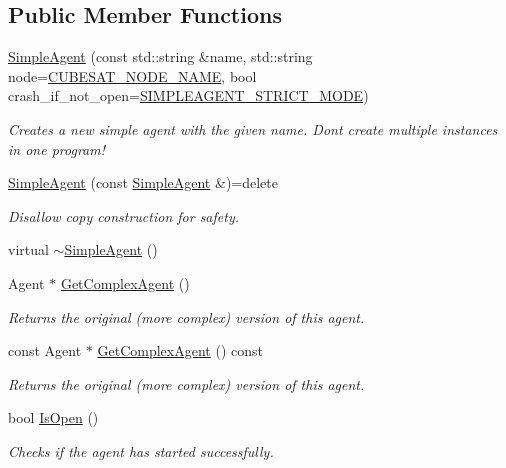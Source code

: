 \subsection*{Public Member Functions}
\begin{DoxyCompactItemize}
\item 
\hyperlink{classcubesat_1_1SimpleAgent_a3ebec0e4954f90ecc14c0f964868ce4f}{Simple\+Agent} (const std\+::string \&name, std\+::string node=\hyperlink{cubesat__defs_8h_adce46043c3a8fc68eaee12044efd08e2}{C\+U\+B\+E\+S\+A\+T\+\_\+\+N\+O\+D\+E\+\_\+\+N\+A\+ME}, bool crash\+\_\+if\+\_\+not\+\_\+open=\hyperlink{SimpleAgent_8h_ae0458b189260d62b7f199e0324dc3cc4}{S\+I\+M\+P\+L\+E\+A\+G\+E\+N\+T\+\_\+\+S\+T\+R\+I\+C\+T\+\_\+\+M\+O\+DE})
\begin{DoxyCompactList}\small\item\em Creates a new simple agent with the given name. Don\textquotesingle{}t create multiple instances in one program! \end{DoxyCompactList}\item 
\hyperlink{classcubesat_1_1SimpleAgent_a000fb5fee9de4738ce05c74fb6756ada}{Simple\+Agent} (const \hyperlink{classcubesat_1_1SimpleAgent}{Simple\+Agent} \&)=delete
\begin{DoxyCompactList}\small\item\em Disallow copy construction for safety. \end{DoxyCompactList}\item 
virtual \hyperlink{classcubesat_1_1SimpleAgent_a523833a44e7fbdb9313f4636cf8f308a}{$\sim$\+Simple\+Agent} ()
\item 
Agent $\ast$ \hyperlink{classcubesat_1_1SimpleAgent_a9d74a206851e212870a610f073f4bd69}{Get\+Complex\+Agent} ()
\begin{DoxyCompactList}\small\item\em Returns the original (more complex) version of this agent. \end{DoxyCompactList}\item 
const Agent $\ast$ \hyperlink{classcubesat_1_1SimpleAgent_a4bf4f56ed4ad5c945db1085a95307b3f}{Get\+Complex\+Agent} () const
\begin{DoxyCompactList}\small\item\em Returns the original (more complex) version of this agent. \end{DoxyCompactList}\item 
bool \hyperlink{classcubesat_1_1SimpleAgent_ac3c2c3b1eb7d5f1e858f57aa741be3c6}{Is\+Open} ()
\begin{DoxyCompactList}\small\item\em Checks if the agent has started successfully. \end{DoxyCompactList}\item 

\end{DoxyCompactItemize}
